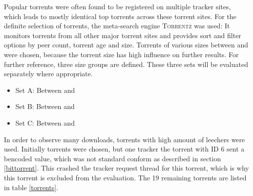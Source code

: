 \documentclass[10pt, a4paper, twoside, headsepline]{scrbook}
\renewcommand{\_}{\origunderscore\allowbreak}
\begin{document}
Popular torrents were often found to be registered on multiple tracker sites, which leads to mostly identical top torrents across these torrent sites. For the definite selection of torrents, the meta-search engine \textsc{Torrentz} \cite{torrentz} was used: It monitors torrents from all other major torrent sites and provides sort and filter options by peer count, torrent age and size.
Torrents of various sizes between  and  were chosen, because the torrent size has high influence on further results. For further reference, three size groups are defined. These three sets will be evaluated separately where appropriate.
\begin{itemize}
\item Set A: Between  and 
\item Set B: Between  and 
\item Set C: Between  and 
\end{itemize}
In order to observe many downloads, torrents with high amount of leechers were used. Initially  torrents were chosen, but one tracker the torrent with ID 6 sent a bencoded value, which was not standard conform as described in section \ref{bittorrent}. This crashed the tracker request thread for this torrent, which is why this torrent is excluded from the evaluation. The 19 remaining torrents are listed in table \ref{torrents}.
\end{document}
